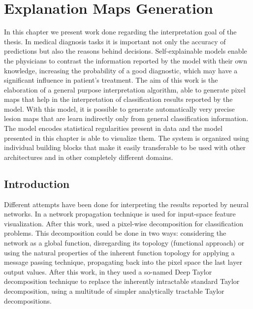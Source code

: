 
\chapter{Explanation Maps Generation} %

\label{Chapter:Interpretation} %

In this chapter we present work done regarding the interpretation goal of the thesis. In medical diagnosis tasks it is important not only the accuracy of predictions but also the reasons behind decisions. Self-explainable models enable the physicians to contrast the information reported by the model with their own knowledge, increasing the probability of a good diagnostic, which may have a significant influence in patient's treatment.  The aim of this work is the elaboration of a general purpose interpretation algorithm, able to generate pixel maps that help in the interpretation of classification results reported by the model. With this model, it is possible to generate automatically very precise lesion maps that are learn indirectly only from general classification information. The model encodes statistical regularities present in data and the model presented in this chapter is able to visualize them. The system is organized using individual building blocks that make it easily transferable to be used with other architectures and in other completely different domains.

\section{Introduction}

Different attempts have been done for interpreting the results reported by neural networks. In \citep{zeiler2014visualizing} a network propagation technique is used for input-space feature visualization. After this work, \citep{bach2015pixel} used a pixel-wise decomposition for classification problems. This decomposition could be done in two ways: considering the network as a global function, disregarding its topology (functional approach) or using the natural properties of the inherent function topology for applying a message passing technique, propagating back into the pixel space the last layer output values. After this work, in \citep{montavon2017explaining} they used a so-named Deep Taylor decomposition technique to replace the inherently intractable standard Taylor decomposition, using a multitude of simpler analytically tractable Taylor decompositions.


